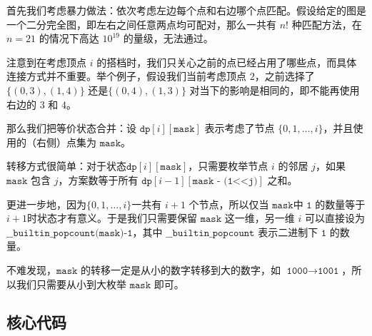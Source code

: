 首先我们考虑暴力做法：依次考虑左边每个点和右边哪个点匹配。假设给定的图是一个二分完全图，即左右之间任意两点均可配对，那么一共有 $n!$ 种匹配方法，在 $n = 21$ 的情况下高达 $10^{19}$ 的量级，无法通过。

注意到在考虑顶点 $i$ 的搭档时，我们只关心之前的点已经占用了哪些点，而具体连接方式并不重要。举个例子，假设我们当前考虑顶点 $2$，之前选择了 $\{(0,3),(1,4) \}$
还是$\{(0,4),(1,3) \}$ 对当下的影响是相同的，即不能再使用右边的 $3$ 和 $4$。

那么我们把等价状态合并：设 $\texttt{dp}[i][\texttt{mask}]$ 表示考虑了节点 $\{0,1,\ldots,i\}$，并且使用的（右侧）点集为 $\texttt{mask}$。

转移方式很简单：对于状态$\texttt{dp}[i][\texttt{mask}]$，只需要枚举节点 $i$ 的邻居 $j$，如果 $\texttt{mask}$ 包含 $j$，方案数等于所有 $\texttt{dp}[i-1][\texttt{mask - (1<<j)}]$ 之和。

更进一步地，因为$\{0,1,\ldots,i\}$一共有 $i+1$ 个节点，所以仅当 $\texttt{mask}$中 $\texttt{1}$ 的数量等于$i + 1$时状态才有意义。于是我们只需要保留 $\texttt{mask}$ 这一维，另一维 $i$ 可以直接设为$\texttt{\_\_builtin\_popcount(mask)-1} $，其中 $\texttt{\_\_builtin\_popcount}$ 表示二进制下 $\texttt{1}$ 的数量。

不难发现，$\texttt{mask}$ 的转移一定是从小的数字转移到大的数字，如 $\texttt{1000} \rightarrow \texttt{1001}$，所以我们只需要从小到大枚举 $\texttt{mask}$ 即可。






\subsection*{核心代码}
\inputminted[linenos,autogobble]{cpp}{./Code/O.cpp}
\newpage